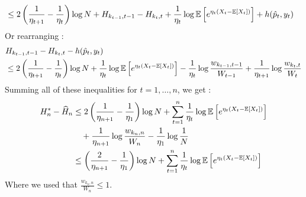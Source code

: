 \begin{solution}[]
\begin{align*}
	&\leq 2 \left( \frac{1}{\eta_{t+1}}- \frac{1}{\eta_t} \right) \log N + H_{k_{t-1},t-1} - H_{k_t,t} + \frac{1}{\eta_t}\log \mathbb{E}\left[e^{\eta_t(X_t-\mathbb{E}\left[X_t\right])}\right] + h(\hat{p}_t,y_t)
\end{align*}
Or rearranging :
\begin{align*}
	& H_{k_{t-1},t-1} - H_{k_t,t} - h(\hat{p}_t,y_t)\\
	&\leq 2 \left( \frac{1}{\eta_{t+1}}- \frac{1}{\eta_t} \right) \log N + \frac{1}{\eta_t}\log \mathbb{E}\left[e^{\eta_t(X_t-\mathbb{E}\left[X_t\right])}\right] -\frac{1}{\eta_t} \log \frac{w_{k_{t-1},t-1}}{W_{t-1}} +\frac{1}{\eta_{t+1}}\log \frac{w_{k_t,t}}{W_t}
\end{align*}
Summing all of these inequalities for $ t=1,\ldots,n $, we get :
\begin{align*}
	H_n^{*} - \widehat{H}_n &\leq 2\left( \frac{1}{\eta_{n+1}} - \frac{1}{\eta_1} \right) \log N + \sum_{t=1}^{n}\frac{1}{\eta_t}\log \mathbb{E}\left[e^{\eta_t(X_t-\mathbb{E}\left[X_t\right])}\right]\\
				&\quad+ \frac{1}{\eta_{n+1}} \log \frac{w_{k_n,n}}{W_n} - \frac{1}{\eta_1}\log \frac{1}{N} \\
				&\leq \left( \frac{2}{\eta_{n+1}} - \frac{1}{\eta_1} \right) \log N + \sum_{t=1}^{n}\frac{1}{\eta_t}\log \mathbb{E}\left[e^{\eta_t(X_t-\mathbb{E}\left[X_t\right])}\right]
\end{align*}
Where we used that $ \frac{w_{k_n,n}}{W_n} \leq 1 $.





\end{solution}

